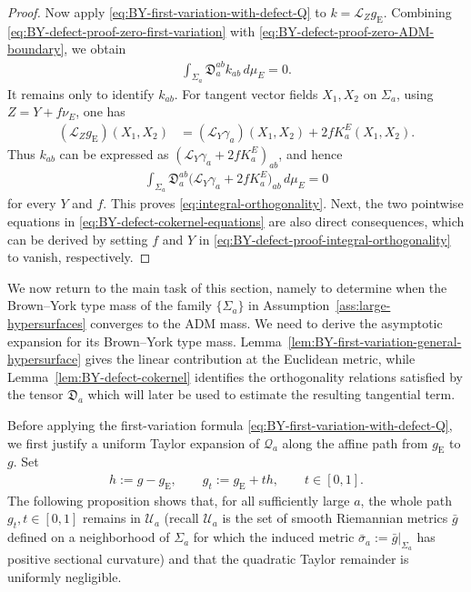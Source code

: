 \documentclass[10pt]{amsart}
\newcommand{\gE}{g_{\mathrm{E}}}
\newcommand{\Lie}{\mathcal{L}}
\theoremstyle{plain}
\theoremstyle{remark}
\begin{document}
\begin{proof}
		Now apply \eqref{eq:BY-first-variation-with-defect-Q} to
		$k=\Lie_Z\gE$. Combining
		\eqref{eq:BY-defect-proof-zero-first-variation} with
		\eqref{eq:BY-defect-proof-zero-ADM-boundary}, we obtain
		\begin{align*}
			\int_{\Sigma_a}\mathfrak D_a^{ab}k_{ab}\,d\mu_E=0 .
		\end{align*}
		It remains only to identify $k_{ab}$. For tangent vector fields $X_1,X_2$ on
		$\Sigma_a$, using $Z=Y+f\nu_E$, one has
		\begin{align*}
			(\Lie_Z\gE)(X_1,X_2)
			&=
			(\Lie_Y\gamma_a)(X_1,X_2)
			+
			2fK_a^E(X_1,X_2).
		\end{align*}
		Thus $k_{ab}$ can be expressed as $(\Lie_Y\gamma_a+2fK_a^E)_{ab}$, and hence
		\begin{align}\label{eq:BY-defect-proof-integral-orthogonality}
			\int_{\Sigma_a}
			\mathfrak D_a^{ab}
			\bigl(
			\Lie_Y\gamma_a+2fK_a^E
			\bigr)_{ab}
			\,d\mu_E
			=
			0
		\end{align}
		for every $Y$ and $f$. This proves \eqref{eq:integral-orthogonality}. Next, the two pointwise equations in \eqref{eq:BY-defect-cokernel-equations} are also direct consequences, which can be derived by setting $f$ and $Y$ in \eqref{eq:BY-defect-proof-integral-orthogonality} to vanish, respectively.
	\end{proof}
	
	\medskip
	
	We now return to the main task of this section, namely to determine when
	the Brown--York type mass of the family $\{\Sigma_a\}$ in
	Assumption~\ref{ass:large-hypersurfaces} converges to the ADM mass. We need to derive the asymptotic expansion for its Brown--York type mass. Lemma~\ref{lem:BY-first-variation-general-hypersurface} gives
	the linear contribution at the Euclidean metric, while
	Lemma~\ref{lem:BY-defect-cokernel} identifies the orthogonality
	relations satisfied by the tensor $\mathfrak D_a$ which will later be
	used to estimate the resulting tangential term.
	
	Before applying the first-variation formula \eqref{eq:BY-first-variation-with-defect-Q}, we first justify a
	uniform Taylor expansion of $\mathcal Q_a$ along the affine path from
	$\gE$ to $g$. Set
	\begin{align*}
		h:=g-\gE,
		\qquad
		g_t:=\gE+t h,
		\qquad
		t\in[0,1].
	\end{align*}
	The following proposition shows that, for all sufficiently large $a$,
	the whole path ${g_t},t\in[0,1]$ remains in $\mathcal U_a$ (recall $\mathcal U_a$ is the set of smooth
	Riemannian metrics $\bar g$ defined on a neighborhood of $\Sigma_a$ for
	which the induced metric $\bar\sigma_a:=\bar g|_{\Sigma_a}$ has positive sectional curvature) and
	that the quadratic Taylor remainder is uniformly negligible.
	
\end{document}
